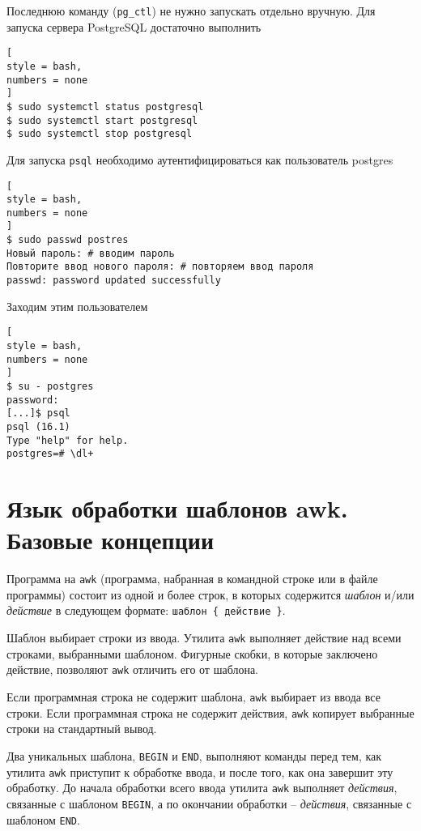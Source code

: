 \documentclass[%
	11pt,
	a4paper,
	utf8,
		]{article}
\begin{document}
Последнюю команду (\verb|pg_ctl|) не нужно запускать отдельно вручную. Для запуска сервера PostgreSQL достаточно выполнить
\begin{lstlisting}[
style = bash,
numbers = none
]
$ sudo systemctl status postgresql
$ sudo systemctl start postgresql
$ sudo systemctl stop postgresql
\end{lstlisting}

Для запуска \verb*|psql| необходимо аутентифицироваться как пользователь postgres
\begin{lstlisting}[
style = bash,
numbers = none
]
$ sudo passwd postres
Новый пароль: # вводим пароль
Повторите ввод нового пароля: # повторяем ввод пароля
passwd: password updated successfully
\end{lstlisting}

Заходим этим пользователем
\begin{lstlisting}[
style = bash,
numbers = none
]
$ su - postgres
password: 
[...]$ psql
psql (16.1)
Type "help" for help.
postgres=# \dl+
\end{lstlisting}



\section{Язык обработки шаблонов awk. Базовые концепции}

Программа на \texttt{awk} (программа, набранная в командной строке или в файле программы) состоит из одной и более строк, в которых содержится \emph{шаблон} и/или \emph{действие} в следующем формате: \verb|шаблон { действие }|.

Шаблон выбирает строки из ввода. Утилита \texttt{awk} выполняет действие над всеми строками, выбранными шаблоном. Фигурные скобки, в которые заключено действие, позволяют \texttt{awk} отличить его от шаблона.

Если программная строка не содержит шаблона, \texttt{awk} выбирает из ввода все строки. Если программная строка не содержит действия, \texttt{awk} копирует выбранные строки на стандартный вывод.

Два уникальных шаблона, \texttt{BEGIN} и \texttt{END}, выполняют команды перед тем, как утилита \texttt{awk} приступит к обработке ввода, и после того, как она завершит эту обработку. До начала обработки всего ввода утилита \texttt{awk} выполняет \emph{действия}, связанные с шаблоном \texttt{BEGIN}, а по окончании обработки -- \emph{действия}, связанные с шаблоном \texttt{END}.
\end{document}
